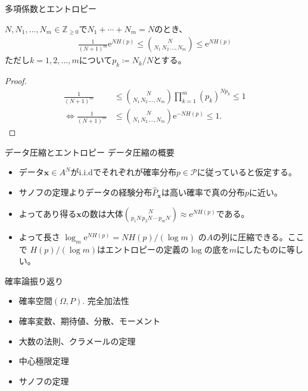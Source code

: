 \documentclass[lualatex,handout]{beamer}
\theoremstyle{definition}
\begin{document}
\begin{frame}{多項係数とエントロピー}
\begin{lemma}
$N,N_1,\dotsc,N_m\in\mathbb{Z}_{\ge 0}$で$N_1+\dotsb+N_m=N$のとき、
\begin{align*}
\frac1{(N+1)^m}\mathrm{e}^{NH(p)}\le
\binom{N}{N_1\,N_2\,\dotsc,N_m} \le \mathrm{e}^{NH(p)}
\end{align*}
ただし$k=1,2,\dotsc,m$について$p_k\coloneq N_k/N$とする。
\end{lemma}
\begin{proof}
\begin{align*}
\frac1{(N+1)^m}&\le
\binom{N}{N_1\,N_2\,\dotsc,N_m} \prod_{k=1}^m (p_k)^{Np_k}\le 1\\
\iff\frac1{(N+1)^m}&\le
\binom{N}{N_1\,N_2\,\dotsc,N_m} \mathrm{e}^{-NH(p)}\le 1.
\end{align*}
\end{proof}
\end{frame}

\begin{frame}{データ圧縮とエントロピー}
データ圧縮の概要

\vspace{2em}
\begin{itemize}
\setlength{\itemsep}{2em}
\item データ$\symbf{x}\in A^N$がi.i.dでそれぞれが確率分布$p\in\mathcal{P}$に従っていると仮定する。
\item サノフの定理よりデータの経験分布$\widehat{P}_{\symbf{x}}$は高い確率で真の分布$p$に近い。
\item よってあり得る$\symbf{x}$の数は大体$\binom{N}{p_1N\,p_2N\,\dotsm\,p_mN}\approx \mathrm{e}^{NH(p)}$である。
\item よって長さ $\log_m \mathrm{e}^{N H(p)} = N H(p)/(\log m)$ の$A$の列に圧縮できる。ここで $H(p)/(\log m)$はエントロピーの定義の$\log$の底を$m$にしたものに等しい。
\end{itemize}
\end{frame}

\begin{frame}{確率論振り返り}
\begin{itemize}
\setlength{\itemsep}{2em}
\item 確率空間$(\Omega, P)$. 完全加法性
\item 確率変数、期待値、分散、モーメント
\item 大数の法則、クラメールの定理
\item 中心極限定理
\item サノフの定理
\end{itemize}
\end{frame}
\end{document}
